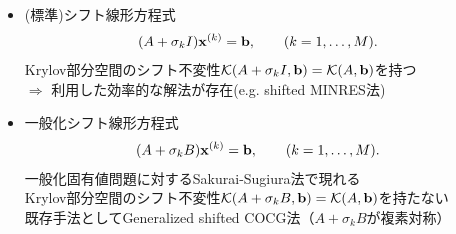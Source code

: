 
\begin{itemize}
	\item (標準)シフト線形方程式
		\begin{align}
			(A + \sigma_{k}I)\vb{x}^{(k)} &= \vb{b}, \qquad (k=1,\dots,M).
		\end{align}
		Krylov部分空間のシフト不変性$\mathcal{K}(A+\sigma_kI, \vb{b}) = \mathcal{K}(A, \vb{b})$を持つ\\
		$\Rightarrow$ 利用した効率的な解法が存在(e.g. shifted MINRES法)
	\vspace{0.2\baselineskip}
	\item 一般化シフト線形方程式
		\begin{align}
			(A + \sigma_{k}B)\vb{x}^{(k)} &= \vb{b}, \qquad (k=1,\dots,M).
		\end{align}
		一般化固有値問題に対するSakurai-Sugiura法で現れる\\
		Krylov部分空間のシフト不変性$\mathcal{K}(A+\sigma_kB, \vb{b}) = \mathcal{K}(A, \vb{b})$を持たない\\
		既存手法としてGeneralized shifted COCG法（$A+\sigma_kB$が複素対称）\cite{ref-SogabeT-2010}
\end{itemize}

